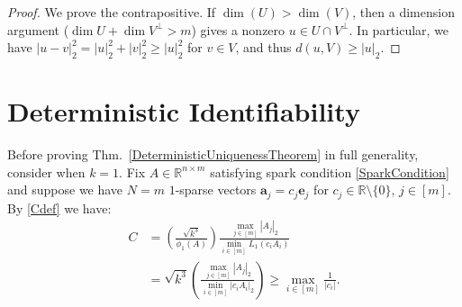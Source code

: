 \documentclass[journal, twocolumn]{IEEEtran}
\begin{document}
\begin{proof}
We prove the contrapositive.  If $\dim(U) > \dim(V)$, then a dimension argument ($\dim U + \dim V^\perp > m$) gives a nonzero $u \in U \cap V^\perp$.  In particular, we have $|u - v|_2^2 = |u|_2^2 + |v|_2^2 \geq |u|_2^2$ for $v \in V$, and thus $d(u,V) \geq |u|_2$.
\end{proof}

\section{Deterministic Identifiability}\label{DUT}

Before proving Thm.~\ref{DeterministicUniquenessTheorem} in full generality, consider when $k=1$. Fix $A \in \mathbb{R}^{n \times m}$ satisfying spark condition \eqref{SparkCondition} and suppose we have $N = m$ $1$-sparse vectors $\mathbf{a}_j = c_j \mathbf{e}_j$ for $c_j \in \mathbb{R} \setminus \{0\}$, $j \in [m]$. By \eqref{Cdef} we have:
\begin{align}\label{C1}
C &= \left( \frac{ \sqrt{k^3}}{ \phi_1(A) } \right) \frac{\max_{j \in [m]} |A_j|_2}{\min_{i \in [m]} L_1(c_iA_i) } \\
&= \sqrt{k^3} \left( \frac{\max_{j \in [m]} |A_j|_2}{\min_{i \in [m]}|c_iA_i|_2} \right)
\geq \max_{i \in [m]} \frac{1}{|c_i|}.
\end{align}
\end{document}
